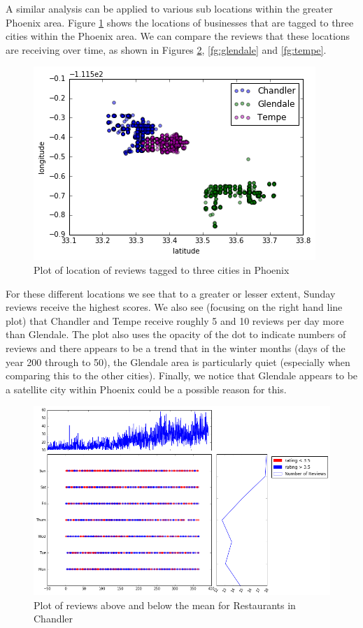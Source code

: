 \documentclass[11pt]{article}
\begin{document}
A similar analysis can be applied to various sub locations within the greater Phoenix area. Figure \ref{fg:locations} shows the locations of businesses that are tagged to three cities within the Phoenix area. We can compare the reviews that these locations are receiving over time, as shown in Figures \ref{fg:chandler}, \ref{fg:glendale} and \ref{fg:tempe}.
\begin{figure}[H]
\centering
\includegraphics[keepaspectratio=true,scale=0.4]{./images/sub_location_plot}
\caption{Plot of location of reviews tagged to three cities in Phoenix}\label{fg:locations}
\end{figure}

For these different locations we see that to a greater or lesser extent, Sunday reviews receive the highest scores. We also see (focusing on the right hand line plot) that Chandler and Tempe receive roughly 5 and 10 reviews per day more than Glendale. The plot also uses the opacity of the dot to indicate numbers of reviews and there appears to be a trend that in the winter months (days of the year 200 through to 50), the Glendale area is particularly quiet (especially when comparing this to the other cities). Finally, we notice that Glendale appears to be a satellite city within Phoenix could be a possible reason for this.
\begin{figure}[H]
\centering
\includegraphics[keepaspectratio=true,scale=0.4]{./images/chandler_restaurants}
\caption{Plot of reviews above and below the mean for Restaurants in Chandler}\label{fg:chandler}
\end{figure}
\end{document}
